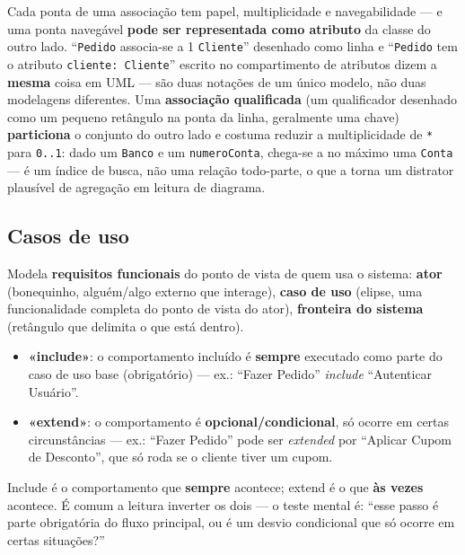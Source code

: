 \begin{cuidado}
Cada ponta de uma associação tem papel, multiplicidade e navegabilidade
--- e uma ponta navegável \textbf{pode ser representada como atributo} da
classe do outro lado. “\texttt{Pedido} associa-se a 1 \texttt{Cliente}”
desenhado como linha e “\texttt{Pedido} tem o atributo \texttt{cliente:
Cliente}” escrito no compartimento de atributos dizem a \textbf{mesma}
coisa em UML --- são duas notações de um único modelo, não duas
modelagens diferentes. Uma \textbf{associação qualificada} (um qualificador
desenhado como um pequeno retângulo na ponta da linha, geralmente uma
chave) \textbf{particiona} o conjunto do outro lado e costuma reduzir a
multiplicidade de \texttt{*} para \texttt{0..1}: dado um \texttt{Banco} e
um \texttt{numeroConta}, chega-se a no máximo uma \texttt{Conta} --- é um
índice de busca, não uma relação todo-parte, o que a torna um distrator
plausível de agregação em leitura de diagrama.
\end{cuidado}

\subsection{Casos de uso}

\begin{conceito}
Modela \textbf{requisitos funcionais} do ponto de vista de quem usa o
sistema: \textbf{ator} (bonequinho, alguém/algo externo que interage),
\textbf{caso de uso} (elipse, uma funcionalidade completa do ponto de vista
do ator), \textbf{fronteira do sistema} (retângulo que delimita o que está
dentro).

\begin{itemize}
\item \textbf{«include»}: o comportamento incluído é \textbf{sempre}
executado como parte do caso de uso base (obrigatório) --- ex.: “Fazer
Pedido” \textit{include} “Autenticar Usuário”.
\item \textbf{«extend»}: o comportamento é \textbf{opcional/condicional},
só ocorre em certas circunstâncias --- ex.: “Fazer Pedido” pode ser
\textit{extended} por “Aplicar Cupom de Desconto”, que só roda se o
cliente tiver um cupom.
\end{itemize}
\end{conceito}

\begin{cuidado}
Include é o comportamento que \textbf{sempre} acontece; extend é o que
\textbf{às vezes} acontece. É comum a leitura inverter os dois --- o teste
mental é: “esse passo é parte obrigatória do fluxo principal, ou é um
desvio condicional que só ocorre em certas situações?”
\end{cuidado}

